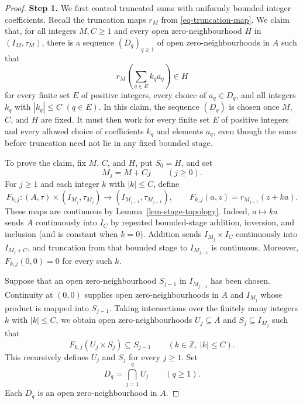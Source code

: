 \documentclass[preprint,3p]{elsarticle}
\theoremstyle{plain}
\theoremstyle{definition}
\numberwithin{equation}{section}
\begin{document}
\begin{proof}
\textbf{Step 1.} We first control truncated sums with uniformly
bounded integer coefficients.
Recall the truncation maps $r_M$ from \eqref{eq-truncation-map}.
We claim that, for all integers $M,C\geq1$ and every open
zero-neighbourhood $H$ in $(I_M,\tau_M)$, there is a sequence
$(D_q)_{q\geq1}$ of open zero-neighbourhoods in $A$ such that
\[
 r_M\left(\sum_{q\in E}k_q a_q\right)\in H
\]
for every finite set $E$ of positive integers, every choice of
$a_q\in D_q$, and all integers $k_q$ with $|k_q|\leq C$ $(q\in E)$.
In this claim, the sequence $(D_q)$ is chosen once $M$, $C$,
and $H$ are fixed.  It must then work for every finite set $E$ of positive
integers and every allowed choice of coefficients $k_q$ and elements $a_q$,
even though the sums before truncation need not lie in any fixed bounded stage.

To prove the claim, fix $M$, $C$, and $H$, put $S_0=H$, and set
\begin{equation}
\label{eq-FBOT-stage-radii}
 M_j=M+Cj
 \qquad(j\geq0).
\end{equation}
For $j\geq1$ and each integer $k$ with $|k|\leq C$, define
\begin{equation}
\label{eq-FBOT-transition-map}
 F_{k,j}\colon
 (A,\tau)\times(I_{M_j},\tau_{M_j})
 \longrightarrow (I_{M_{j-1}},\tau_{M_{j-1}}),
 \qquad
 F_{k,j}(a,z)=r_{M_{j-1}}(z+ka).
\end{equation}
These maps are continuous by Lemma~\ref{lem-stage-topology}.
Indeed, $a\mapsto ka$ sends $A$ continuously into $I_C$ by
repeated bounded-stage addition, inversion, and inclusion
(and is constant when $k=0$).  Addition sends
$I_{M_j}\times I_C$ continuously into $I_{M_j+C}$, and
truncation from that bounded stage to $I_{M_{j-1}}$ is continuous.
Moreover, $F_{k,j}(0,0)=0$ for every such $k$.

Suppose that an open zero-neighbourhood $S_{j-1}$ in
$I_{M_{j-1}}$ has been chosen.
Continuity at $(0,0)$ supplies open zero-neighbourhoods in $A$
and $I_{M_j}$ whose product is mapped into $S_{j-1}$.
Taking intersections over the finitely many integers $k$ with
$|k|\leq C$, we obtain open zero-neighbourhoods
$U_j\subseteq A$ and $S_j\subseteq I_{M_j}$ such that
\begin{equation}
\label{eq-FBOT-recursive-control}
 F_{k,j}(U_j\times S_j)\subseteq S_{j-1}
 \qquad(k\in\mathbb Z,\ |k|\leq C).
\end{equation}
This recursively defines $U_j$ and $S_j$ for every $j\geq1$.
Set
\[
 D_q=\bigcap_{j=1}^q U_j
 \qquad(q\geq1).
\]
Each $D_q$ is an open zero-neighbourhood in $A$.


\end{proof}
\end{document}
